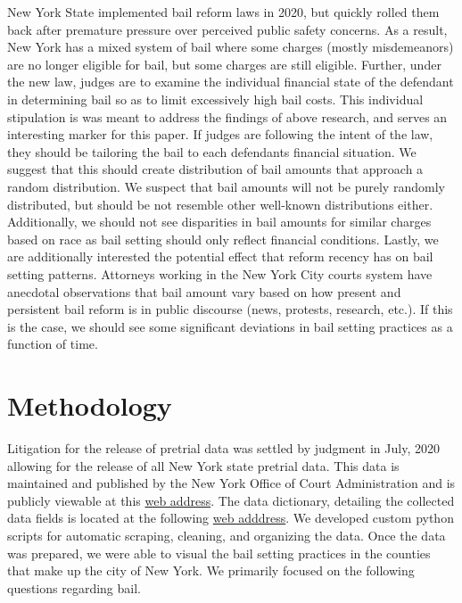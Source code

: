 \documentclass[
  english,
  man]{apa6}
\begin{document}
New York State implemented bail reform laws in 2020, but quickly rolled them back after premature pressure over perceived public safety concerns. As a result, New York has a mixed system of bail where some charges (mostly misdemeanors) are no longer eligible for bail, but some charges are still eligible. Further, under the new law, judges are to examine the individual financial state of the defendant in determining bail so as to limit excessively high bail costs. This individual stipulation is was meant to address the findings of above research, and serves an interesting marker for this paper. If judges are following the intent of the law, they should be tailoring the bail to each defendants financial situation. We suggest that this should create distribution of bail amounts that approach a random distribution. We suspect that bail amounts will not be purely randomly distributed, but should be not resemble other well-known distributions either. Additionally, we should not see disparities in bail amounts for similar charges based on race as bail setting should only reflect financial conditions. Lastly, we are additionally interested the potential effect that reform recency has on bail setting patterns. Attorneys working in the New York City courts system have anecdotal observations that bail amount vary based on how present and persistent bail reform is in public discourse (news, protests, research, etc.). If this is the case, we should see some significant deviations in bail setting practices as a function of time.

\hypertarget{methodology}{%
\section{Methodology}\label{methodology}}

Litigation for the release of pretrial data was settled by judgment in July, 2020 allowing for the release of all New York state pretrial data. This data is maintained and published by the New York Office of Court Administration and is publicly viewable at this \href{https://ww2.nycourts.gov/pretrial-release-data-33136}{web address}. The data dictionary, detailing the collected data fields is located at the following \href{https://www.nycourts.gov/legacypdfs/court-research/PretrialReleaseDataDictionaryWeb.pdf}{web adddress}. We developed custom python scripts for automatic scraping, cleaning, and organizing the data. Once the data was prepared, we were able to visual the bail setting practices in the counties that make up the city of New York. We primarily focused on the following questions regarding bail.
\end{document}
